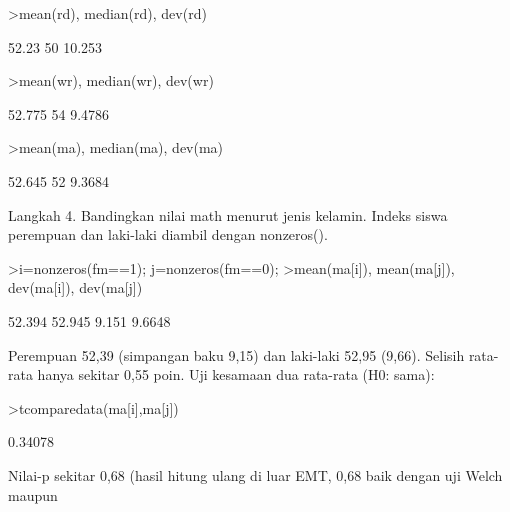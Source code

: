 \documentclass[a4paper,10pt]{article}
\begin{document}
\begin{eulernotebook}
\begin{eulercomment}
\begin{eulercomment}
\begin{eulercomment}
\begin{eulercomment}
\begin{eulercomment}
\begin{eulercomment}
\begin{eulercomment}
\begin{eulercomment}
\begin{eulercomment}
\begin{eulercomment}
\begin{eulercomment}
\begin{eulercomment}
\begin{eulercomment}
\begin{eulercomment}
\begin{eulercomment}
\begin{eulercomment}
\begin{eulercomment}
\begin{eulercomment}
\begin{eulercomment}
\begin{eulercomment}
\begin{eulercomment}
\begin{eulercomment}
\begin{eulercomment}
\begin{eulercomment}
\begin{eulercomment}
\begin{eulercomment}
\begin{eulercomment}
\begin{eulercomment}
\begin{eulerprompt}
>mean(rd), median(rd), dev(rd)
\end{eulerprompt}
\begin{euleroutput}
  52.23
  50
  10.253
\end{euleroutput}
\begin{eulerprompt}
>mean(wr), median(wr), dev(wr)
\end{eulerprompt}
\begin{euleroutput}
  52.775
  54
  9.4786
\end{euleroutput}
\begin{eulerprompt}
>mean(ma), median(ma), dev(ma)
\end{eulerprompt}
\begin{euleroutput}
  52.645
  52
  9.3684
\end{euleroutput}
\begin{eulercomment}
Langkah 4. Bandingkan nilai math menurut jenis kelamin. Indeks siswa perempuan dan laki-laki
diambil dengan nonzeros().
\end{eulercomment}
\begin{eulerprompt}
>i=nonzeros(fm==1); j=nonzeros(fm==0);
>mean(ma[i]), mean(ma[j]), dev(ma[i]), dev(ma[j])
\end{eulerprompt}
\begin{euleroutput}
  52.394
  52.945
  9.151
  9.6648
\end{euleroutput}
\begin{eulercomment}
Perempuan 52,39 (simpangan baku 9,15) dan laki-laki 52,95 (9,66). Selisih rata-rata hanya
sekitar 0,55 poin. Uji kesamaan dua rata-rata (H0: sama):
\end{eulercomment}
\begin{eulerprompt}
>tcomparedata(ma[i],ma[j])
\end{eulerprompt}
\begin{euleroutput}
  0.34078
\end{euleroutput}
\begin{eulercomment}
Nilai-p sekitar 0,68 (hasil hitung ulang di luar EMT, 0,68 baik dengan uji Welch maupun

\end{eulercomment}
\end{eulercomment}
\end{eulercomment}
\end{eulercomment}
\end{eulercomment}
\end{eulercomment}
\end{eulercomment}
\end{eulercomment}
\end{eulercomment}
\end{eulercomment}
\end{eulercomment}
\end{eulercomment}
\end{eulercomment}
\end{eulercomment}
\end{eulercomment}
\end{eulercomment}
\end{eulercomment}
\end{eulercomment}
\end{eulercomment}
\end{eulercomment}
\end{eulercomment}
\end{eulercomment}
\end{eulercomment}
\end{eulercomment}
\end{eulercomment}
\end{eulercomment}
\end{eulercomment}
\end{eulercomment}
\end{eulercomment}
\end{eulernotebook}
\end{document}
